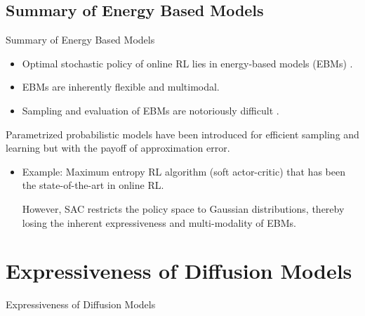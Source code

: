 \documentclass[aspectratio=169,xcolor=dvipsnames]{beamer}
\begin{document}
\subsection{Summary of Energy Based Models}

\begin{frame}{Summary of Energy Based Models}
    \begin{itemize}
        \item Optimal stochastic policy of online RL lies in energy-based models (EBMs) \cite{haarnoja2017reinforcement}.
        \item EBMs are inherently flexible and multimodal.
        \item  \alert{Sampling and evaluation of EBMs are notoriously difficult \cite{song2021train}}.
    \end{itemize}
    Parametrized probabilistic models have been introduced for
    efficient sampling and learning but with the payoff of approximation error.
    \begin{itemize}
        \item Example: Maximum entropy RL algorithm (soft actor-critic) that has
        been the state-of-the-art in online RL. 
 
     However, SAC restricts the policy space to Gaussian distributions, thereby losing the inherent expressiveness and multi-modality of EBMs.
    \end{itemize}
\end{frame}

\section{Expressiveness of Diffusion Models}


\begin{frame}{Expressiveness of Diffusion Models}
\end{frame}
\end{document}
